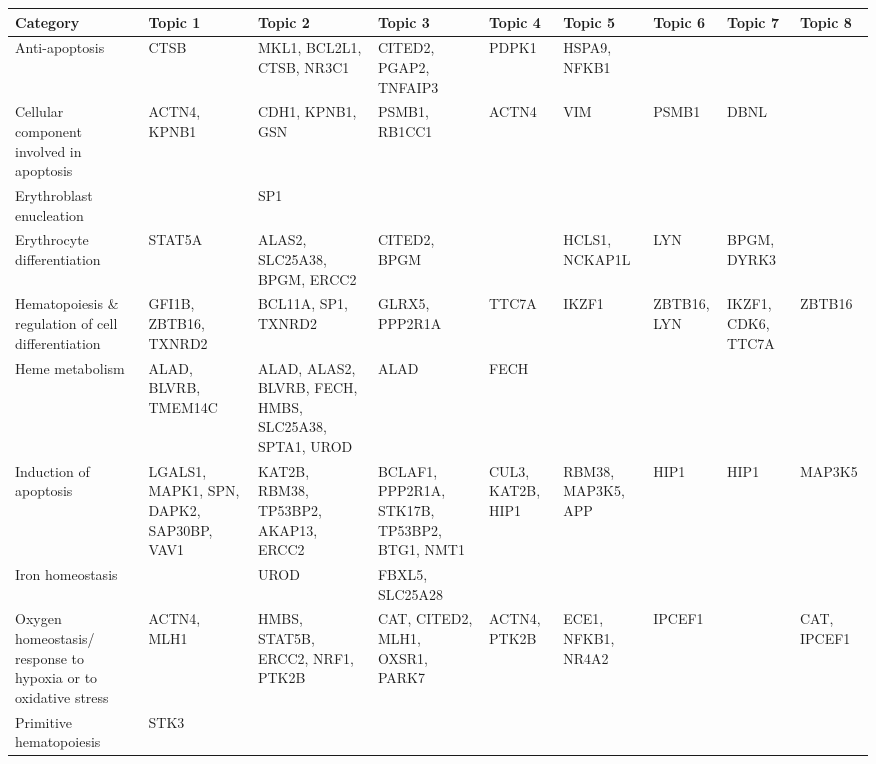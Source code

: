 \clearpage%
\begin{landscape}

  \begin{table}
    \tiny
\begin{tabularx}{\hsize}{XXXXXXXXX}
  
  \toprule
Category & Topic  1 & Topic  2 & Topic  3 & Topic  4 & Topic  5 & Topic  6 & Topic  7 & Topic  8\\
\midrule
Anti-apoptosis & CTSB & MKL1, BCL2L1, CTSB, NR3C1 & CITED2, PGAP2, TNFAIP3 & PDPK1 & HSPA9, NFKB1 &   &   &  \\
Cellular component involved in apoptosis & ACTN4, KPNB1 & CDH1, KPNB1, GSN & PSMB1, RB1CC1 & ACTN4 & VIM & PSMB1 & DBNL &  \\
Erythroblast enucleation &   & SP1 &   &   &   &   &   &  \\
Erythrocyte differentiation & STAT5A & ALAS2, SLC25A38, BPGM, ERCC2 & CITED2, BPGM &   & HCLS1, NCKAP1L & LYN & BPGM, DYRK3 &  \\
Hematopoiesis \& regulation of cell differentiation & GFI1B, ZBTB16, TXNRD2 & BCL11A, SP1, TXNRD2 & GLRX5, PPP2R1A & TTC7A & IKZF1 & ZBTB16, LYN & IKZF1, CDK6, TTC7A & ZBTB16\\
Heme metabolism & ALAD, BLVRB, TMEM14C & ALAD, ALAS2, BLVRB, FECH, HMBS, SLC25A38, SPTA1, UROD & ALAD & FECH &   &   &   &  \\
Induction of apoptosis & LGALS1, MAPK1, SPN, DAPK2, SAP30BP, VAV1 & KAT2B, RBM38, TP53BP2, AKAP13, ERCC2 & BCLAF1, PPP2R1A, STK17B, TP53BP2, BTG1, NMT1 & CUL3, KAT2B, HIP1 & RBM38, MAP3K5, APP & HIP1 & HIP1 & MAP3K5\\
Iron homeostasis &   & UROD & FBXL5, SLC25A28 &   &   &   &   &  \\
Oxygen homeostasis/ response to hypoxia or to oxidative stress & ACTN4, MLH1 & HMBS, STAT5B, ERCC2, NRF1, PTK2B & CAT, CITED2, MLH1, OXSR1, PARK7 & ACTN4, PTK2B & ECE1, NFKB1, NR4A2 & IPCEF1 &   & CAT, IPCEF1\\
Primitive hematopoiesis & STK3 &   &   &   &   &   &   &  \\
\bottomrule
  \end{tabularx}

  \label{table:mello_genes}
\end{table}
\end{landscape}
\clearpage%


